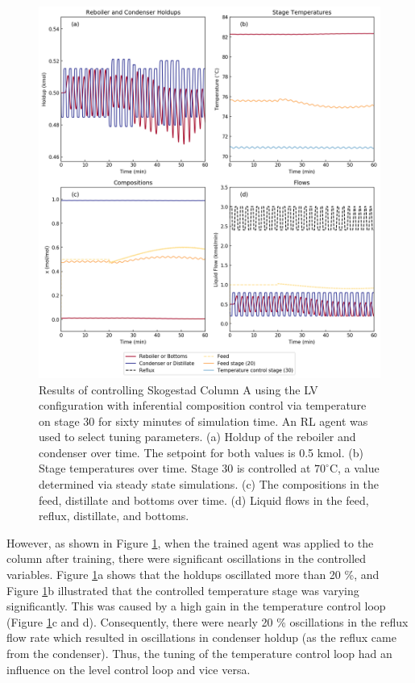 \begin{figure}[p]
  \includegraphics[width=\textwidth]{gfx/Chapter05/20200424_trained_policy_sixty_minutes.png}
  \caption{Results of controlling Skogestad Column A using the LV configuration with inferential composition control via temperature on stage 30 for sixty minutes of simulation time. An RL agent was used to select tuning parameters. (a) Holdup of the reboiler and condenser over time. The setpoint for both values is 0.5 kmol. (b) Stage temperatures over time. Stage 30 is controlled at $70^{\circ}$C, a value determined via steady state simulations. (c) The compositions in the feed, distillate and bottoms over time. (d) Liquid flows in the feed, reflux, distillate, and bottoms.}
  \label{trained_policy}
\end{figure} 

However, as shown in Figure \ref{trained_policy}, when the trained agent was applied to the column after training, there were significant oscillations in the controlled variables. Figure \ref{trained_policy}a shows that the holdups oscillated more than 20 \%, and Figure \ref{trained_policy}b illustrated that the controlled temperature stage was varying significantly. This was caused by a high gain in the temperature control loop (Figure \ref{trained_policy}c and d). Consequently, there were nearly 20 \% oscillations in the reflux flow rate which resulted in oscillations in condenser holdup (as the reflux came from the condenser). Thus, the tuning of the temperature control loop had an influence on the level control loop and vice versa.

